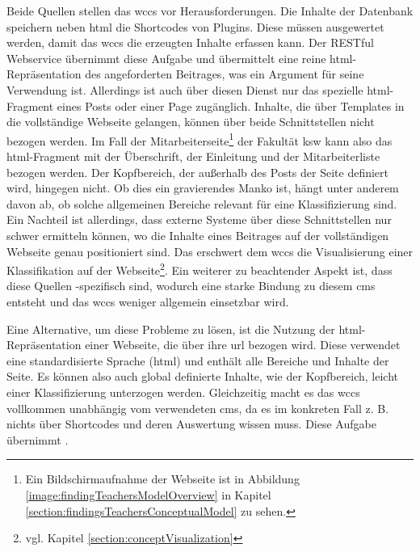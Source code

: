         Beide Quellen stellen das \gls{wccs} vor Herausforderungen.
        Die Inhalte der Datenbank speichern neben \gls{html} die Shortcodes
        von Plugins.
        Diese müssen ausgewertet werden, damit das \gls{wccs} die erzeugten Inhalte
        erfassen kann.
        Der RESTful Webservice übernimmt diese Aufgabe und übermittelt
        eine reine \gls{html}-Repräsentation des angeforderten Beitrages,
        was ein Argument für seine Verwendung ist.
        Allerdings ist auch über diesen Dienst nur das spezielle \gls{html}-Fragment eines
        Posts oder einer Page zugänglich.
        Inhalte, die über Templates in die vollständige Webseite gelangen,
        können über beide Schnittstellen nicht bezogen werden.
        Im Fall der Mitarbeiterseite\footnote{Ein Bildschirmaufnahme der Webseite
        ist in Abbildung \ref{image:findingTeachersModelOverview} in Kapitel
        \ref{section:findingsTeachersConceptualModel} zu sehen.}
        der Fakultät \gls{ksw}
        kann also das \gls{html}-Fragment mit der Überschrift, der Einleitung
        und der Mitarbeiterliste bezogen werden.
        Der Kopfbereich, der außerhalb des Posts der Seite definiert wird,
        hingegen nicht.
        Ob dies ein gravierendes Manko ist, hängt unter anderem davon ab,
        ob solche allgemeinen Bereiche relevant für eine Klassifizierung sind.
        Ein Nachteil ist allerdings, dass externe Systeme über diese Schnittstellen
        nur schwer ermitteln können, wo die Inhalte eines Beitrages auf der vollständigen Webseite genau positioniert sind.
        Das erschwert dem \gls{wccs} die Visualisierung einer
        Klassifikation auf der Webseite\footnote{vgl. Kapitel \ref{section:conceptVisualization}}.       
        Ein weiterer zu beachtender Aspekt ist, dass diese Quellen {\wordpress}-spezifisch sind,
        wodurch eine starke Bindung zu diesem \gls{cms} entsteht
        und das \gls{wccs} weniger allgemein einsetzbar wird.

        Eine Alternative, um diese Probleme zu lösen,
        ist die Nutzung der \gls{html}-Repräsentation einer Webseite,
        die über ihre \gls{url} bezogen wird.
        Diese verwendet eine standardisierte Sprache (\gls{html}) und enthält
        alle Bereiche und Inhalte der Seite.
        Es können also auch global definierte Inhalte,
        wie der Kopfbereich, leicht einer Klassifizierung unterzogen werden.
        Gleichzeitig macht es das \gls{wccs} vollkommen unabhängig vom verwendeten \gls{cms},
        da es im konkreten Fall z. B. nichts über Shortcodes und deren Auswertung wissen muss.
        Diese Aufgabe übernimmt {\wordpress}.

